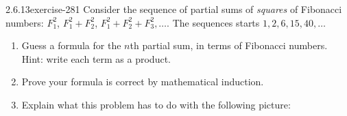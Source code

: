 \documentclass[twoside,11pt,]{book}
\numberwithin{equation}{chapter}
\begin{document}
\begin{divisionsolution}{2.6.13}{}{exercise-281}%
\hypertarget{p-3815}{}%
Consider the sequence of partial sums of \emph{squares} of Fibonacci numbers: \(F_1^2\), \(F_1^2 + F_2^2\), \(F_1^2 + F_2^2 + F_3^2, \ldots\).  The sequences starts \(1, 2, 6, 15, 40,\ldots\)\leavevmode%
\begin{enumerate}[label=(\alph*)]
\item\hypertarget{li-2032}{}\hypertarget{p-3816}{}%
Guess a formula for the \(n\)th partial sum, in terms of Fibonacci numbers.  Hint: write each term as a product.%
\item\hypertarget{li-2033}{}\hypertarget{p-3817}{}%
Prove your formula is correct by mathematical induction.%
\item\hypertarget{li-2034}{}\hypertarget{p-3818}{}%
Explain what this problem has to do with the following picture:%
\begin{sidebyside}{1}{0.375}{0.375}{0}%
\begin{sbspanel}{0.25}%
\end{sbspanel}%
\end{sidebyside}%
\end{enumerate}
%
\end{divisionsolution}%
\end{document}
